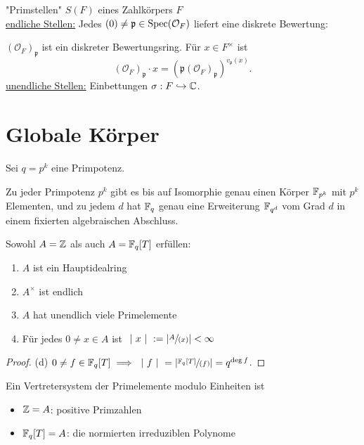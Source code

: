 \begin{bemerkungnr}
    "Primstellen" $S(F)$ eines Zahlkörpers $F$\\
    \underline{endliche Stellen:} Jedes $(0) \ne \mathfrak{p} \in \operatorname{Spec}(\mathcal{O}_F)$ liefert eine diskrete Bewertung:

    $(\mathcal{O}_F)_\mathfrak{p}$ ist ein diskreter Bewertungsring. Für $x \in F^\times$ ist 
    $$ (\mathcal{O}_F)_\mathfrak{p}\cdot x = (\mathfrak{p}(\mathcal{O}_F)_\mathfrak{p})^{v_\mathfrak{p}(x)}.$$
    \underline{unendliche Stellen:} Einbettungen $\sigma: F \hookrightarrow \mathbb{C}$.
\end{bemerkungnr}

\section{Globale Körper}
Sei $q = p^k$ eine Primpotenz.

\begin{erinnerungnr}
    Zu jeder Primpotenz $p^k$ gibt es bis auf Isomorphie genau einen Körper $\mathbb{F}_{p^k}$ mit $p^k$ Elementen, und zu jedem $d$ hat
    $\mathbb{F}_q$ genau eine Erweiterung $\mathbb{F}_{q^d}$ vom Grad $d$ in einem fixierten algebraischen Abschluss.
\end{erinnerungnr}

\begin{satz}
    Sowohl $A = \mathbb{Z}$ als auch $A = \mathbb{F}_q[T]$ erfüllen:
    \begin{enumerate}[label=(\alph*)]
        \item $A$ ist ein Hauptidealring
        \item $A^\times$ ist endlich
        \item $A$ hat unendlich viele Primelemente
        \item Für jedes $0 \ne x \in A$ ist $~|~x~|~:= |\sfrac{A}{(x)}| < \infty$
    \end{enumerate}
\end{satz}
\begin{proof}
    (d) $0 \ne f \in \mathbb{F}_q[T] \implies ~|~f~|~ = | \sfrac{\mathbb{F}_q[T]}{(f)} | = q^{\deg f}$.
\end{proof}

\begin{bemerkungnr}
    Ein Vertretersystem der Primelemente modulo Einheiten ist
    \begin{itemize}
        \item $\mathbb{Z}=A$: positive Primzahlen
        \item $\mathbb{F}_q[T]=A$: die normierten irreduziblen Polynome
    \end{itemize}
\end{bemerkungnr}

